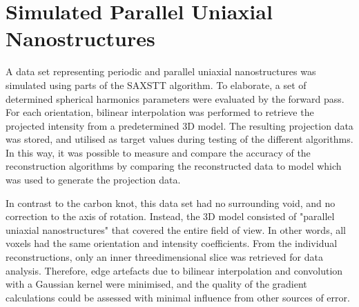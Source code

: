 \section{Simulated Parallel Uniaxial Nanostructures} %
\label{sec:reconstruction_data_sets_periodic_parallel_uniaxial_nanostructures}
A data set representing periodic and parallel uniaxial nanostructures was simulated using parts of the SAXSTT algorithm.
To elaborate, a set of determined spherical harmonics parameters were evaluated by the forward pass.
For each orientation, bilinear interpolation was performed to retrieve the projected intensity from a predetermined 3D model.
The resulting projection data was stored, and utilised as target values during testing of the different algorithms.
In this way, it was possible to measure and compare the accuracy of the reconstruction algorithms by comparing the reconstructed data to model which was used to generate the projection data.

In contrast to the carbon knot, this data set had no surrounding void, and no correction to the axis of rotation.
Instead, the 3D model consisted of "parallel uniaxial nanostructures" that covered the entire field of view.
In other words, all voxels had the same orientation and intensity coefficients.
From the individual reconstructions, only an inner threedimensional slice was retrieved for data analysis.
Therefore, edge artefacts due to bilinear interpolation and convolution with a Gaussian kernel were minimised,
and the quality of the gradient calculations could be assessed with minimal influence from other sources of error.




